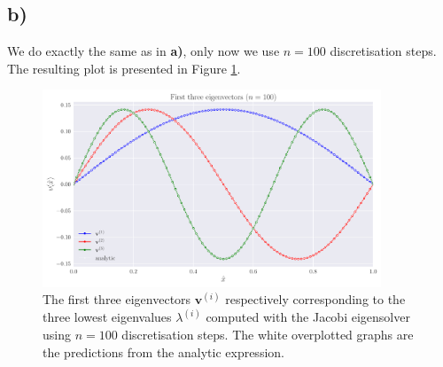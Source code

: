 \documentclass[english,notitlepage,nofootinbib]{revtex4-1}  %
\renewcommand{\vec}{\mathbf}
\begin{document}
\subsection*{b)}

We do exactly the same as in \textbf{a)}, only now we use $n=100$ discretisation steps. The resulting plot is presented in Figure \ref{fig:p6_solution100steps}.

\begin{figure}[h!]
    \centering
    \includegraphics[width=0.9\textwidth]{solution_100steps.pdf}
    \caption{The first three eigenvectors $\vec{v}^{(i)}$ respectively corresponding to the three lowest eigenvalues $\lambda^{(i)}$ computed with the Jacobi eigensolver using $n=100$ discretisation steps. The white overplotted graphs are the predictions from the analytic expression.}\label{fig:p6_solution100steps}
\end{figure}

   
\end{document}
